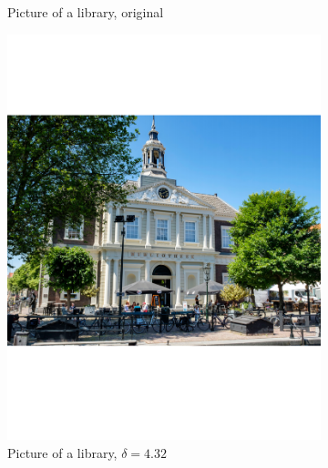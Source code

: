 \documentclass[a4paper]{article}
\begin{document}
\begin{figure}[H]
\begin{subfigure}{0.49\textwidth}
		\caption{Picture of a library, original}
		\label{sub:Bib}
	\end{subfigure}
	\begin{subfigure}{0.49\textwidth}
	\centering
	\includegraphics[trim={4cm 8cm 4cm 8cm},clip,width=1\textwidth]{Images/BibGood.pdf}
	\caption{Picture of a library, $\delta = 4.32$}
	\label{sub:BibGood}
\end{subfigure}
	\begin{subfigure}{0.49\textwidth}
	\centering

\end{subfigure}
\end{figure}
\end{document}
